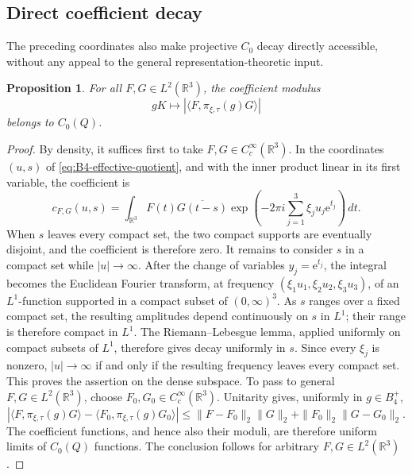 \documentclass[10pt,a4paper]{amsart}
\numberwithin{equation}{section}
\newtheorem{proposition}[theorem]{Proposition}
\newcommand{\R}{\mathbb R}
\newcommand{\e}{\mathrm e}
\begin{document}
\subsection{Direct coefficient decay}

The preceding coordinates also make projective $C_0$ decay directly
accessible, without any appeal to the general representation-theoretic
input.

\begin{proposition}
\label{prop:B4-direct-C0}
For all $F,G\in L^2(\R^3)$, the coefficient modulus
\[
 gK\longmapsto
 \left|\langle F,\pi_{\xi,\tau}(g)G\rangle\right|
\]
belongs to $C_0(Q)$.
\end{proposition}

\begin{proof}
By density, it suffices first to take $F,G\in C_c^\infty(\R^3)$.  In the
coordinates $(u,s)$ of \eqref{eq:B4-effective-quotient}, and with the inner
product linear in its first variable, the coefficient is
\begin{equation}
 c_{F,G}(u,s)
 =\int_{\R^3}
 F(t)\overline{G(t-s)}
 \exp\left(
 -2\pi i\sum_{j=1}^3\xi_ju_j\e^{t_j}
 \right)\,dt.
 \label{eq:B4-coefficient}
\end{equation}
When $s$ leaves every compact set, the two compact supports are eventually
disjoint, and the coefficient is therefore zero.  It remains to consider
$s$ in a compact set while $|u|\to\infty$.  After the change of variables
$y_j=\e^{t_j}$, the integral becomes the Euclidean Fourier transform, at
frequency
$(\xi_1u_1,\xi_2u_2,\xi_3u_3)$, of an $L^1$-function supported in a compact
subset of $(0,\infty)^3$.  As $s$ ranges over a fixed compact set, the
resulting amplitudes depend continuously on $s$ in $L^1$; their range is
therefore compact in $L^1$.  The Riemann--Lebesgue lemma, applied uniformly
on compact subsets of $L^1$, therefore gives decay uniformly in $s$.  Since every $\xi_j$
is nonzero, $|u|\to\infty$ if and only if the resulting frequency leaves
every compact set.  This proves the assertion on the dense subspace.  To
pass to general $F,G\in L^2(\R^3)$, choose
$F_0,G_0\in C_c^\infty(\R^3)$.  Unitarity gives, uniformly in
$g\in B_4^+$,
\[
 \left|
 \langle F,\pi_{\xi,\tau}(g)G\rangle-
 \langle F_0,\pi_{\xi,\tau}(g)G_0\rangle
 \right|
 \leq
 \|F-F_0\|_2\|G\|_2+
 \|F_0\|_2\|G-G_0\|_2.
\]
The coefficient functions, and hence also their moduli, are therefore
uniform limits of $C_0(Q)$ functions.  The conclusion follows for arbitrary
$F,G\in L^2(\R^3)$.
\end{proof}
\end{document}
